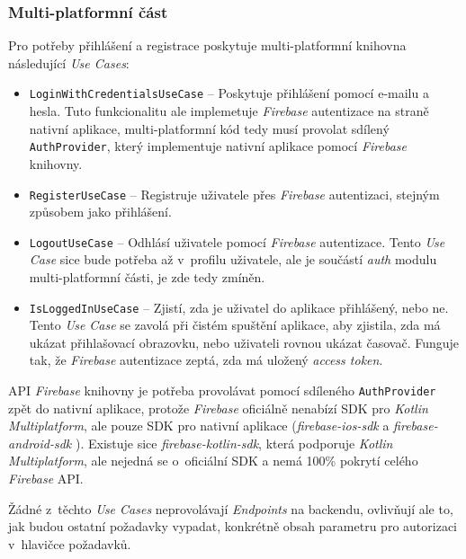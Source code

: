\subsubsection{Multi-platformní část}

Pro potřeby přihlášení a registrace poskytuje multi-platformní knihovna následující \emph{Use Cases}:
\begin{itemize}
\item\texttt{LoginWithCredentialsUseCase} – Poskytuje přihlášení pomocí e-mailu a hesla. Tuto funkcionalitu ale implemetuje \emph{Firebase} autentizace na straně nativní aplikace, multi-platformní kód tedy musí provolat sdílený \texttt{AuthProvider}, který implementuje nativní aplikace pomocí \emph{Firebase} knihovny.
\item\texttt{RegisterUseCase} – Registruje uživatele přes \emph{Firebase} autentizaci, stejným způsobem jako přihlášení.
\item\texttt{LogoutUseCase} – Odhlásí uživatele pomocí \emph{Firebase} autentizace. Tento \emph{Use Case} sice bude potřeba až v~profilu uživatele, ale je součástí \emph{auth} modulu multi-platformní části, je zde tedy zmíněn.
\item\texttt{IsLoggedInUseCase} – Zjistí, zda je uživatel do aplikace přihlášený, nebo ne. Tento \emph{Use Case} se zavolá při čistém spuštění aplikace, aby zjistila, zda má ukázat přihlašovací obrazovku, nebo uživateli rovnou ukázat časovač. Funguje tak, že \emph{Firebase} autentizace zeptá, zda má uložený \emph{access token}.
\end{itemize}

API \emph{Firebase} knihovny je potřeba provolávat pomocí sdíleného \texttt{AuthProvider} zpět do nativní aplikace, protože \emph{Firebase} oficiálně nenabízí SDK pro \emph{Kotlin Multiplatform}, ale pouze SDK pro nativní aplikace (\emph{firebase-ios-sdk} \cite{firebase-ios-sdk} a \emph{firebase-android-sdk} \cite{firebase-android-sdk}). Existuje sice \emph{firebase-kotlin-sdk}, která podporuje \emph{Kotlin Multiplatform}, ale nejedná se o~oficiální SDK a nemá 100\% pokrytí celého \emph{Firebase} API.

Žádné z~těchto \emph{Use Cases} neprovolávají \emph{Endpoints} na backendu, ovlivňují ale to, jak budou ostatní požadavky vypadat, konkrétně obsah parametru pro autorizaci v~hlavičce požadavků.

